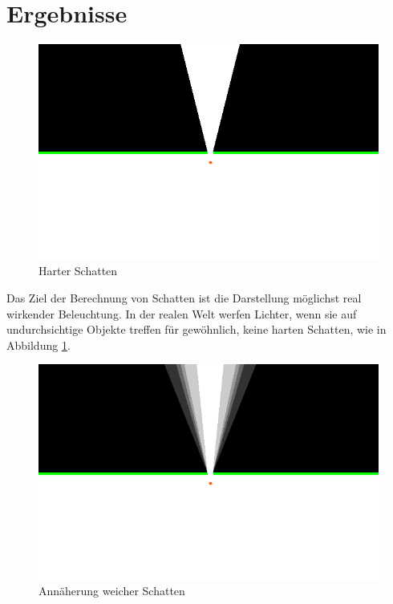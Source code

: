 \section{Ergebnisse}

\begin{figure}[t]
	\centering
	\includegraphics[width=\columnwidth]{images/ergebnis_3.png}
	\caption{Harter Schatten}
	\label{fig:ergeb4}
\end{figure}

Das Ziel der Berechnung von Schatten ist die Darstellung möglichst real wirkender Beleuchtung. In
der realen Welt werfen Lichter, wenn sie auf undurchsichtige Objekte treffen für gewöhnlich, keine
harten Schatten, wie in Abbildung \ref{fig:ergeb4}.

\begin{figure}[t]
	\centering
	\includegraphics[width=\columnwidth]{images/ergebnis_2.png}
	\caption{Annäherung weicher Schatten}
	\label{fig:ergeb3}
\end{figure}

